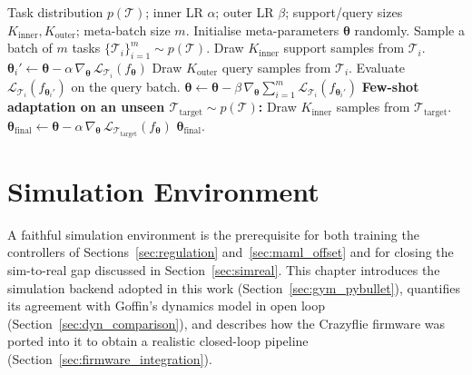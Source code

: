 \documentclass[11pt,a4paper]{article}
\theoremstyle{remark}
\numberwithin{equation}{section}
\begin{document}
\begin{algorithm}[h]
\caption{MAML meta-training and few-shot adaptation (canonical
formulation~\cite{finn2017maml}). The fixed-task-set variant used in this work
is described in Section~\ref{sec:maml_training}.}
\label{alg:maml}
\begin{algorithmic}[1]
\Require Task distribution $p(\mathcal{T})$; inner LR $\alpha$; outer LR $\beta$;
         support/query sizes $K_{\mathrm{inner}}, K_{\mathrm{outer}}$;
         meta-batch size $m$.
\State Initialise meta-parameters $\boldsymbol{\theta}$ randomly.
    \State Sample a batch of $m$ tasks $\{\mathcal{T}_i\}_{i=1}^{m} \sim p(\mathcal{T})$.
        \State Draw $K_{\mathrm{inner}}$ support samples from $\mathcal{T}_i$.
        \State $\boldsymbol{\theta}_i' \gets \boldsymbol{\theta}
               - \alpha\,\nabla_{\boldsymbol{\theta}}\,
               \mathcal{L}_{\mathcal{T}_i}(f_{\boldsymbol{\theta}})$
        \State Draw $K_{\mathrm{outer}}$ query samples from $\mathcal{T}_i$.
        \State Evaluate $\mathcal{L}_{\mathcal{T}_i}\!\left(f_{\boldsymbol{\theta}_i'}\right)$
               on the query batch.
    \EndFor
    \State $\boldsymbol{\theta} \gets \boldsymbol{\theta}
           - \beta\,\nabla_{\boldsymbol{\theta}}\sum_{i=1}^{m}
           \mathcal{L}_{\mathcal{T}_i}\!\left(f_{\boldsymbol{\theta}_i'}\right)$
\EndWhile
\Statex
\State \textbf{Few-shot adaptation on an unseen $\mathcal{T}_{\mathrm{target}} \sim p(\mathcal{T})$:}
\State Draw $K_{\mathrm{inner}}$ samples from $\mathcal{T}_{\mathrm{target}}$.
\State $\boldsymbol{\theta}_{\mathrm{final}} \gets \boldsymbol{\theta}
       - \alpha\,\nabla_{\boldsymbol{\theta}}\,
       \mathcal{L}_{\mathcal{T}_{\mathrm{target}}}(f_{\boldsymbol{\theta}})$
\State \Return $\boldsymbol{\theta}_{\mathrm{final}}$.
\end{algorithmic}
\end{algorithm}

\newpage
\section{Simulation Environment}

A faithful simulation environment is the prerequisite for both training the
controllers of Sections~\ref{sec:regulation} and~\ref{sec:maml_offset} and for
closing the sim-to-real gap discussed in Section~\ref{sec:simreal}. This chapter
introduces the simulation backend adopted in this work
(Section~\ref{sec:gym_pybullet}), quantifies its agreement with Goffin's dynamics
model in open loop (Section~\ref{sec:dyn_comparison}), and describes how the
Crazyflie firmware was ported into it to obtain a realistic closed-loop pipeline
(Section~\ref{sec:firmware_integration}).
\end{document}
